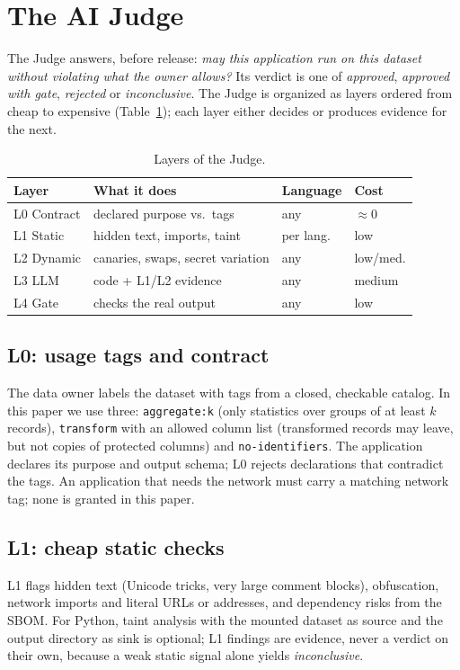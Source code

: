 \section{The AI Judge}\label{sec:judge}

The Judge answers, before release: \emph{may this application run on this dataset without
violating what the owner allows?} Its verdict is one of \emph{approved}, \emph{approved with gate},
\emph{rejected} or \emph{inconclusive}. The Judge is organized as layers ordered from cheap to
expensive (Table~\ref{tab:layers}); each layer either decides or produces evidence for the next.

\begin{table}[t]
\centering
\caption{Layers of the Judge.}
\label{tab:layers}
\footnotesize
\begin{tabular}{@{}llll@{}}
\toprule
Layer & What it does & Language & Cost \\
\midrule
L0 Contract & declared purpose vs.\ tags & any & $\approx$0 \\
L1 Static & hidden text, imports, taint & per lang. & low \\
L2 Dynamic & canaries, swaps, secret variation & any & low/med. \\
L3 LLM & code + L1/L2 evidence & any & medium \\
L4 Gate & checks the real output & any & low \\
\bottomrule
\end{tabular}
\end{table}

\subsection{L0: usage tags and contract}
The data owner labels the dataset with tags from a closed, checkable catalog. In this paper we use
three: \texttt{aggregate:k} (only statistics over groups of at least $k$ records),
\texttt{transform} with an allowed column list (transformed records may leave, but not copies of
protected columns) and \texttt{no-identifiers}. The application declares its purpose and output
schema; L0 rejects declarations that contradict the tags. An application that needs the network
must carry a matching network tag; none is granted in this paper.

\subsection{L1: cheap static checks}
L1 flags hidden text (Unicode tricks, very large comment blocks), obfuscation, network imports and
literal URLs or addresses, and dependency risks from the SBOM. For Python, taint analysis with the
mounted dataset as source and the output directory as sink is optional; L1 findings are evidence,
never a verdict on their own, because a weak static signal alone yields \emph{inconclusive}.

